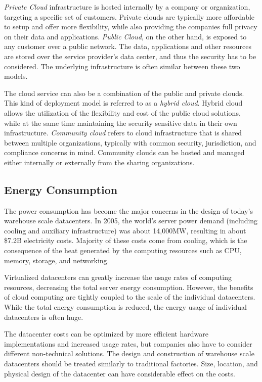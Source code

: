 \emph{Private Cloud} infrastructure is hosted internally by a company or organization, targeting a specific set of customers. Private clouds are typically more affordable to setup and offer more flexibility, while also providing the companies full privacy on their data and applications. \emph{Public Cloud}, on the other hand, is exposed to any customer over a public network. The data, applications and other resources are stored over the service provider's data center, and thus the security has to be considered. The underlying infrastructure is often similar between these two models.~\cite{Mell:2011:ccdef}

The cloud service can also be a combination of the public and private clouds. This kind of deployment model is referred to as a \emph{hybrid cloud}. Hybrid cloud allows the utilization of the flexibility and cost of the public cloud solutions, while at the same time maintaining the security sensitive data in their own infrastructure. \emph{Community cloud} refers to cloud infrastructure that is shared between multiple organizations, typically with common security, jurisdiction, and compliance concerns in mind. Community clouds can be hosted and managed either internally or externally from the sharing organizations.~\cite{Mell:2011:ccdef}

\subsection{Energy Consumption}
The power consumption has become the major concerns in the design of today's warehouse scale datacenters. In 2005, the world's server power demand (including cooling and auxiliary infrastructure) was about 14,000MW, resulting in about \$7.2B electricity costs. Majority of these costs come from cooling, which is the consequence of the heat generated by the computing resources such as CPU, memory, storage, and networking.~\cite{Koomey:2007:PC, Fan:2007:PPW}

Virtualized datacenters can greatly increase the usage rates of computing resources, decreasing the total server energy consumption. However, the benefits of cloud computing are tightly coupled to the scale of the individual datacenters. While the total energy consumption is reduced, the energy usage of individual datacenters is often huge.~\cite{Hoelzle:2009:DCI}

The datacenter costs can be optimized by more efficient hardware implementations and increased usage rates, but companies also have to consider different non-technical solutions. The design and construction of warehouse scale datacenters should be treated similarly to traditional factories. Size, location, and physical design of the datacenter can have considerable effect on the costs.~\cite{Hoelzle:2009:DCI}

